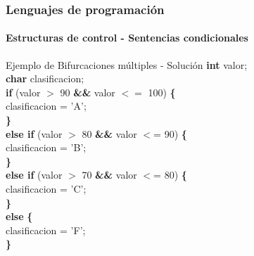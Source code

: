 \documentclass{beamer}
\begin{document}
\begin{frame}
  \frametitle{Lenguajes de programación}
  \framesubtitle{Estructuras de control - Sentencias condicionales}

  \begin{block}{Ejemplo de Bifurcaciones múltiples - Solución}
    {\scriptsize
      \textbf{int} valor;\\
      \textbf{char} clasificacion;\\
      \vspace{0.3cm}
      \textbf{if} (valor $>$ 90 \hspace{0.1cm} \textbf{\&\&} \hspace{0.1cm} valor $<=$ 100) \textbf{\{} \\
      \hspace{0.3cm} clasificacion = 'A';\\
      \textbf{\}} \\
      \textbf{else if} (valor $>$ 80 \hspace{0.1cm} \textbf{\&\&} \hspace{0.1cm} valor $<$= 90) \textbf{\{} \\
      \hspace{0.3cm} clasificacion = 'B';\\
      \textbf{\}} \\
      \textbf{else if} (valor $>$ 70 \hspace{0.1cm} \textbf{\&\&} \hspace{0.1cm} valor $<$= 80) \textbf{\{} \\
      \hspace{0.3cm} clasificacion = 'C';\\
      \textbf{\}} \\
      \textbf{else} \textbf{\{} \\
      \hspace{0.3cm} clasificacion = 'F';\\
      \textbf{\}}
    }
  \end{block}
\end{frame}
\end{document}
